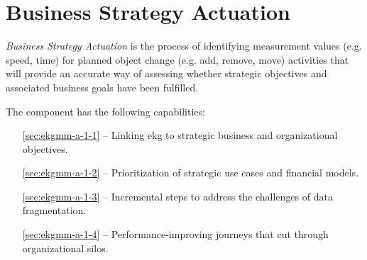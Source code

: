 \chapter{Business Strategy Actuation}\label{ch:ekgmm-a-1} %

\textit{Business Strategy Actuation} is the process of identifying measurement values (e.g. speed, time)
for planned object change (e.g. add, remove, move) activities that will provide an accurate way of
assessing whether strategic objectives and associated business goals have been fulfilled.

The  component has the following capabilities:

\begin{itemize}[leftmargin=.5in]
  \item [\ref{sec:ekgmm-a-1-1}]  -- Linking \gls{ekg} to strategic business and organizational objectives.
  \item [\ref{sec:ekgmm-a-1-2}]  -- Prioritization of strategic use cases and financial models.
  \item [\ref{sec:ekgmm-a-1-3}]  -- Incremental steps to address the challenges of data fragmentation.
  \item [\ref{sec:ekgmm-a-1-4}]  -- Performance-improving journeys that cut through organizational silos.
\end{itemize}





